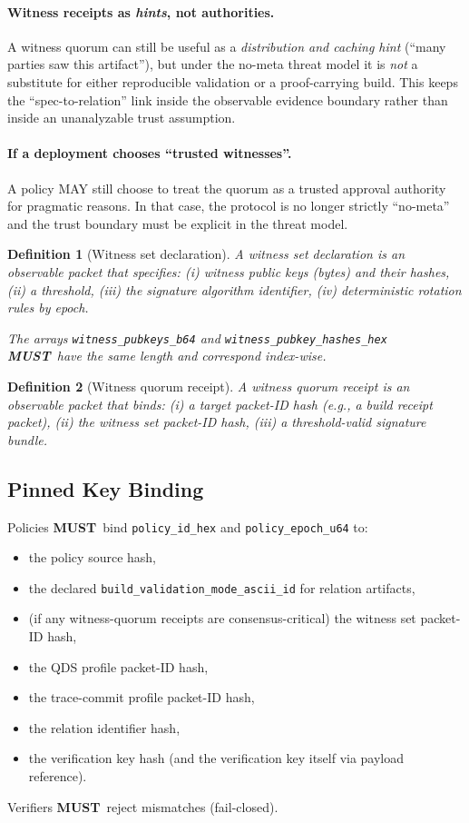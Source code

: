 \documentclass[11pt]{article}
\newcommand{\MUST}{\textbf{MUST}}
\newtheorem{definition}{Definition}
\begin{document}
\paragraph{Witness receipts as \emph{hints}, not authorities.}
A witness quorum can still be useful as a \emph{distribution and caching hint} (``many parties saw this artifact''), but under the no-meta threat model it is \emph{not} a substitute for either reproducible validation or a proof-carrying build.
This keeps the ``spec-to-relation'' link inside the observable evidence boundary rather than inside an unanalyzable trust assumption.


\paragraph{If a deployment chooses ``trusted witnesses''.}
A policy MAY still choose to treat the quorum as a trusted approval authority for pragmatic reasons.
In that case, the protocol is no longer strictly ``no-meta'' and the trust boundary must be explicit in the threat model.

\begin{definition}[Witness set declaration]
A witness set declaration is an observable packet that specifies:
(i) witness public keys (bytes) and their hashes,
(ii) a threshold,
(iii) the signature algorithm identifier,
(iv) deterministic rotation rules by epoch.

The arrays \texttt{witness\_pubkeys\_b64} and \texttt{witness\_pubkey\_hashes\_hex} \MUST\ have the same length and correspond index-wise.
\end{definition}

\begin{definition}[Witness quorum receipt]
A witness quorum receipt is an observable packet that binds:
(i) a target packet-ID hash (e.g., a build receipt packet),
(ii) the witness set packet-ID hash,
(iii) a threshold-valid signature bundle.
\end{definition}

\subsection{Pinned Key Binding}

Policies \MUST\ bind \texttt{policy\_id\_hex} and \texttt{policy\_epoch\_u64} to:
\begin{itemize}[leftmargin=1.2em]
  \item the policy source hash,
  \item the declared \texttt{build\_validation\_mode\_ascii\_id} for relation artifacts,
  \item (if any witness-quorum receipts are consensus-critical) the witness set packet-ID hash,
  \item the QDS profile packet-ID hash,
  \item the trace-commit profile packet-ID hash,
  \item the relation identifier hash,
  \item the verification key hash (and the verification key itself via payload reference).
\end{itemize}
Verifiers \MUST\ reject mismatches (fail-closed).
\end{document}
